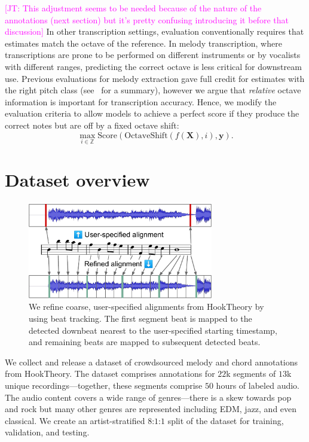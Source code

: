 \documentclass{article}
\newcommand{\hooktheory}{HookTheory}
\newcommand\john[1]{\textcolor{magenta}{[JT: #1]}}
\begin{document}
\john{This adjustment seems to be needed because of the nature of the annotations (next section) but it's pretty confusing introducing it before that discussion}
In other transcription settings, evaluation conventionally requires that estimates match the octave of the reference. 
In melody transcription, where transcriptions are prone to be performed on different instruments or by vocalists with different ranges, predicting the correct octave is less critical for downstream use. 
Previous evaluations for melody extraction gave full credit for estimates with the right pitch class (see~\cite{poliner2007melody} for a summary), however we argue that \emph{relative} octave information is important for transcription accuracy. 
Hence, we modify the evaluation criteria to allow models to achieve a perfect score if they produce the correct notes but are off by a fixed octave shift:
\begin{equation*}
    \max_{i \in \mathbb{Z}} \text{Score}(\text{OctaveShift}(f(\bm{X}), i), \mathbf{y}).
\end{equation*}

\section{Dataset overview}
\label{sec:dataset}

\begin{figure}
    \centering
    \includegraphics[width=8.1cm]{figs/alignment.pdf}
    \caption{We refine coarse, user-specified alignments from \hooktheory{} by using beat tracking. The first segment beat is mapped to the detected downbeat nearest to the user-specified starting timestamp, and remaining beats are mapped to subsequent detected beats.}
 \label{fig:alignment}
\end{figure}

We collect and release a dataset of crowdsourced melody and chord annotations from \hooktheory{}. 
The dataset comprises annotations for $22$k segments of $13$k unique recordings---together, these segments comprise $50$ hours of labeled audio. 
The audio content covers a wide range of genres---there is a skew towards pop and rock but many other genres are represented including EDM, jazz, and even classical. 
We create an artist-stratified $8$:$1$:$1$ split of the dataset for training, validation, and testing.
\end{document}
